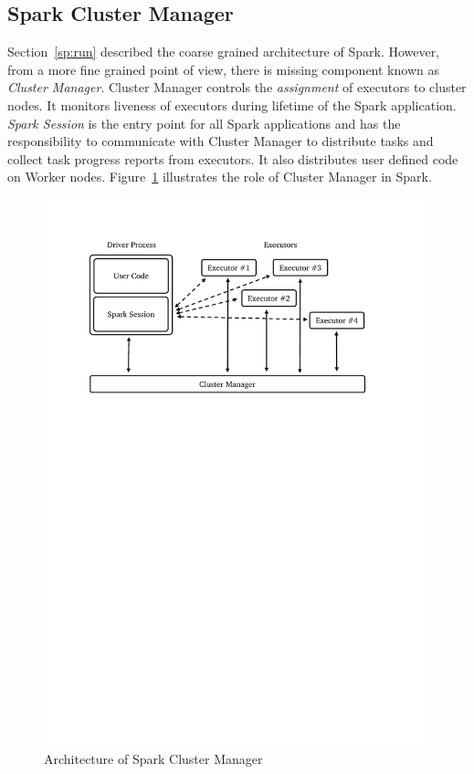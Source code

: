 \subsection{Spark Cluster Manager}
\label{sp:cluster}

Section~\ref{sp:run} described the coarse grained architecture of Spark. However, from a more fine grained point of view, there is missing component known as \emph{Cluster Manager}. Cluster Manager controls the \emph{assignment} of executors to cluster nodes. It monitors liveness of executors during lifetime of the Spark application. \emph{Spark Session} is the entry point for all Spark applications and has the responsibility to communicate with Cluster Manager to distribute tasks and collect task progress reports from executors. It also distributes user defined code on Worker nodes. Figure~\ref{fig:spark-cluster} illustrates the role of Cluster Manager in Spark.
\begin{figure}[H]
    \centering
    \includegraphics[clip,trim=2.4cm 19cm 3.5cm 2cm,scale=0.7]{spark-cluster.pdf}
    \caption[Architecture of Spark Cluster Manager]{Architecture of Spark Cluster Manager\footnotemark}
    \label{fig:spark-cluster}
\end{figure}

